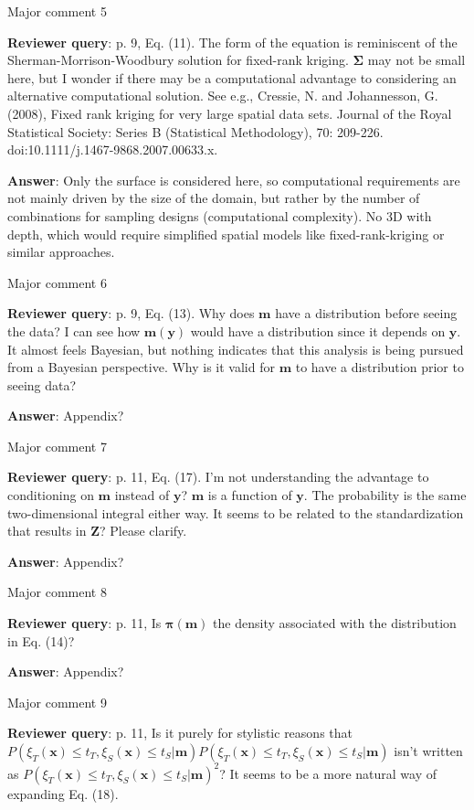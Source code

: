 \documentclass[a4paper]{article}
\newcommand{\bm}{ {\boldsymbol m} }
\newcommand{\bx}{ {\boldsymbol x} }
\newcommand{\by}{ {\boldsymbol y} }
\newcommand{\bZ}{ {\boldsymbol Z} }
\newcommand{\bpi}{ {\boldsymbol \pi} }
\newcommand{\bSigma}{ {\boldsymbol \Sigma} }
\def\reply{\textbf{Reviewer query}}
\def\action{\textbf{Answer}}
\begin{document}
\begin{answers}
\item{Major comment 5}\label{r2c5}

\reply: p. 9, Eq. (11). The form of the equation is reminiscent of the Sherman-Morrison-Woodbury solution for fixed-rank kriging. $\bSigma$ may not be small here, but I wonder if there may be a computational advantage to considering an alternative computational solution.  See e.g., Cressie, N. and Johannesson, G. (2008), Fixed rank kriging for very large spatial data sets. Journal of the Royal Statistical Society: Series B (Statistical Methodology), 70: 209-226. doi:10.1111/j.1467-9868.2007.00633.x.

\action: Only the surface is considered here, so computational requirements are not mainly driven by the size of the domain, but rather by the number of combinations for sampling designs (computational complexity). No 3D with depth, which would require simplified spatial models like fixed-rank-kriging or similar approaches. 

\item{Major comment 6}\label{r2c6}

\reply: p. 9, Eq. (13). Why does $\bm$ have a distribution before seeing the data? I can see how $\bm(\by)$ would have a distribution since it depends on $\by$. It almost feels Bayesian, but nothing indicates that this analysis is being pursued from a Bayesian perspective. Why is it valid for $\bm$ to have a distribution prior to seeing data?

\action: Appendix? 

\item{Major comment 7}\label{r2c7}

\reply: p. 11, Eq. (17). I’m not understanding the advantage to conditioning on $\bm$ instead of $\by$? $\bm$ is a function of $\by$. The probability is the same two-dimensional integral either way. It seems to be related to the standardization that results in $\bZ$? Please clarify.

\action: Appendix? 

\item{Major comment 8}\label{r2c8}

\reply: p. 11, Is $\bpi(\bm)$ the density associated with the distribution in Eq. (14)? 

\action: Appendix? 

\item{Major comment 9}\label{r2c9}

\reply: p. 11, Is it purely for stylistic reasons that $P(\xi_T(\bx) \leq t_T, \xi_S(\bx) \leq t_S |\bm)P(\xi_T(\bx) \leq t_T, \xi_S(\bx) \leq t_S |\bm)$ isn’t written as $P(\xi_T(\bx) \leq t_T, \xi_S(\bx) \leq t_S |\bm)^2$? It seems to be a more natural way of expanding Eq. (18). 


\end{answers}
\end{document}
